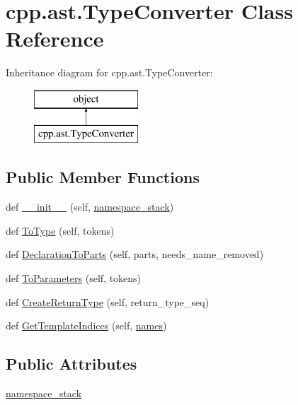 \hypertarget{classcpp_1_1ast_1_1_type_converter}{}\section{cpp.\+ast.\+Type\+Converter Class Reference}
\label{classcpp_1_1ast_1_1_type_converter}
Inheritance diagram for cpp.\+ast.\+Type\+Converter\+:\begin{figure}[H]
\begin{center}
\leavevmode
\includegraphics[height=2.000000cm]{d1/d5a/classcpp_1_1ast_1_1_type_converter}
\end{center}
\end{figure}
\subsection*{Public Member Functions}
\begin{DoxyCompactItemize}
\item 
def \mbox{\hyperlink{classcpp_1_1ast_1_1_type_converter_ae6e75773d6722cdbb96d510a49cb633a}{\+\_\+\+\_\+init\+\_\+\+\_\+}} (self, \mbox{\hyperlink{classcpp_1_1ast_1_1_type_converter_abb739f15c6cd0800e07c086c2b30833e}{namespace\+\_\+stack}})
\item 
def \mbox{\hyperlink{classcpp_1_1ast_1_1_type_converter_aa6ea82e40cd30e5dfcd471ff144a19cf}{To\+Type}} (self, tokens)
\item 
def \mbox{\hyperlink{classcpp_1_1ast_1_1_type_converter_a7c9d20d107c2bc0eb80afdf04957825f}{Declaration\+To\+Parts}} (self, parts, needs\+\_\+name\+\_\+removed)
\item 
def \mbox{\hyperlink{classcpp_1_1ast_1_1_type_converter_aeaf27fb1890f65d7216703df610b46d5}{To\+Parameters}} (self, tokens)
\item 
def \mbox{\hyperlink{classcpp_1_1ast_1_1_type_converter_a7e4d429131d9d5742ec44c78b61beb87}{Create\+Return\+Type}} (self, return\+\_\+type\+\_\+seq)
\item 
def \mbox{\hyperlink{classcpp_1_1ast_1_1_type_converter_a7b5244be5a0caedd769ae866f8a182aa}{Get\+Template\+Indices}} (self, \mbox{\hyperlink{_mutual_8h_a78a6dba1026eca68e2950c3857634cb3}{names}})
\end{DoxyCompactItemize}
\subsection*{Public Attributes}
\begin{DoxyCompactItemize}
\item 
\mbox{\hyperlink{classcpp_1_1ast_1_1_type_converter_abb739f15c6cd0800e07c086c2b30833e}{namespace\+\_\+stack}}
\end{DoxyCompactItemize}
